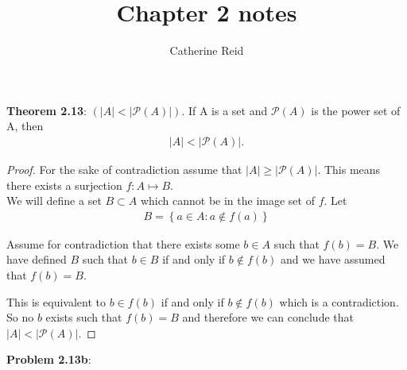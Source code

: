 \documentclass{article}
\author{Catherine Reid}
\title{Chapter 2 notes}
\date{}
\begin{document}
\maketitle

\textbf{Theorem 2.13}: $(|A| < | \mathcal{P}(A)|)$. If A is a set and $\mathcal{P}(A)$ is the power set of A, then
\begin{align*}
	|A| < | \mathcal{P}(A)|.
\end{align*}

\begin{proof}
	For the sake of contradiction assume that $|A| \geq | \mathcal{P}(A)|$. This means there exists a surjection $f: A \mapsto B$.\\

	We will define a set $B \subset A$ which cannot be in the image set of $f$. Let
	\begin{align*}
		B = \left\{a \in A: a \notin f(a) \right\}
	\end{align*}

	Assume for contradiction that there exists some $b \in A$ such that $f(b) = B$. We have defined $B$ such that $b \in B$ if and only if $b \notin f(b)$ and we have assumed that $f(b) = B$.

	This is equivalent to $b \in f(b)$ if and only if $b \notin f(b)$ which is a contradiction.
	So no $b$ exists such that $f(b) = B$ and therefore we can conclude that $|A| < | \mathcal{P}(A)|$.

\end{proof}

\textbf{Problem 2.13b}:
\end{document}
